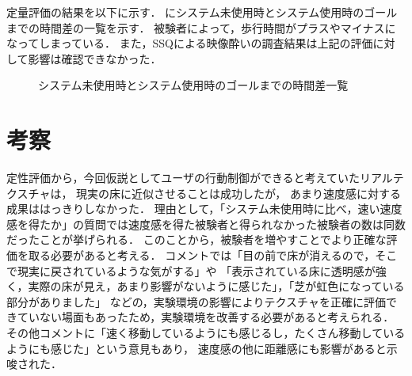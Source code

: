 定量評価の結果を以下に示す．
にシステム未使用時とシステム使用時のゴールまでの時間差の一覧を示す．
被験者によって，歩行時間がプラスやマイナスになってしまっている．
また，SSQによる映像酔いの調査結果は上記の評価に対して影響は確認できなかった．
\begin{figure}[H]
    \centering
    \caption{システム未使用時とシステム使用時のゴールまでの時間差一覧}
    \label{fig:teiryo}
\end{figure}



\section{考察}
定性評価から，今回仮説としてユーザの行動制御ができると考えていたリアルテクスチャは，
現実の床に近似させることは成功したが，
あまり速度感に対する成果ははっきりしなかった．
理由として，「システム未使用時に比べ，速い速度感を得たか」の質問では速度感を得た被験者と得られなかった被験者の数は同数だったことが挙げられる．
このことから，被験者を増やすことでより正確な評価を取る必要があると考える．
コメントでは「目の前で床が消えるので，そこで現実に戻されているような気がする」や
「表示されている床に透明感が強く，実際の床が見え，あまり影響がないように感じた」，「芝が虹色になっている部分がありました」
などの，実験環境の影響によりテクスチャを正確に評価できていない場面もあったため，実験環境を改善する必要があると考えられる．
その他コメントに「速く移動しているようにも感じるし，たくさん移動しているようにも感じた」という意見もあり，
速度感の他に距離感にも影響があると示唆された．

